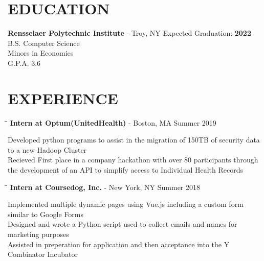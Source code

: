 \documentclass{res}
\begin{document}
 


\address{\bf  ADDRESS\\11 Riverside Drive APT 7WE\\New York, NY 10023}
\address{\bf Contact Info \\ eli@elischiff.org \\   (646) 574-5224}
                                  
\begin{resume}


\section{EDUCATION}          
    {\bf Rensselaer Polytechnic Institute} - Troy, NY \hfill Expected Graduation: {\bf 2022} \\        
    B.S. Computer Science   \\    
    Minors in Economics  \\        
    G.P.A. 3.6          

 
\section{EXPERIENCE}
   \vspace{-0.1in}	
   \begin{tabbing}
   \hspace{2.3in}\= \hspace{2.6in}\= \kill %
    {\bf Intern at Optum(UnitedHealth)} - Boston, MA   \>  \>Summer 2019
   \end{tabbing}\vspace{-20pt}      %
    Developed python programs to assist in the migration of 150TB of security data to a new Hadoop Cluster\\
    Recieved First place in a company hackathon with over 80 participants through the development of an API to simplify access to Individual Health Records
   \begin{tabbing}
   \hspace{2.3in}\= \hspace{2.6in}\= \kill %
    {\bf Intern at Coursedog, Inc.} - New York, NY   \>  \>Summer 2018
   \end{tabbing}\vspace{-20pt}      %
    Implemented multiple dynamic pages using Vue.js including a custom form similar to Google Forms\\
    Designed and wrote a Python script used to collect emails and names for marketing purposes\\          
    Assisted in preperation for application and then acceptance into the Y Combinator Incubator
   \begin{tabbing}%
   

\end{tabbing}
\end{resume}
\end{document}

